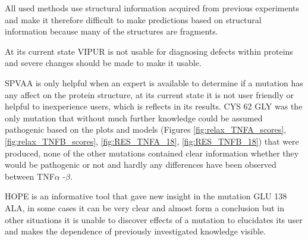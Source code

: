 All used methods use structural information acquired from previous experiments and make it therefore difficult to make predictions based on structural information because many of the structures are fragments.

At its current state VIPUR is not usable for diagnosing defects within proteins and severe changes should be made to make it usable. 

SPVAA is only helpful when an expert is available to determine if a mutation has any affect on the protein structure,  at its current state it is not user friendly or helpful to inexperience users, which is reflects in its results. CYS 62 GLY was the only mutation that without much further knowledge could be assumed pathogenic based on the plots and models (Figures \ref{fig:relax_TNFA_scores}, \ref{fig:relax_TNFB_scores}, \ref{fig:RES_TNFA_18}, \ref{fig:RES_TNFB_18}) that were produced, none of the other mutations contained clear information whether they would be pathogenic or not and hardly any differences have been observed between TNF$\alpha$ -$\beta$. 

HOPE is an informative tool that gave new insight in the mutation GLU 138 ALA, in some cases it can be very clear and almost form a conclusion but in other situations it is unable to discover effects of a mutation to elucidates its user and makes the dependence of previously investigated knowledge visible.
